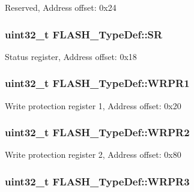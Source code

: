 Reserved, Address offset\-: 0x24 \hypertarget{struct_f_l_a_s_h___type_def_a52c4943c64904227a559bf6f14ce4de6}{
\subsubsection[{S\-R}]{ uint32\-\_\-t F\-L\-A\-S\-H\-\_\-\-Type\-Def\-::\-S\-R}}\label{struct_f_l_a_s_h___type_def_a52c4943c64904227a559bf6f14ce4de6}
Status register, Address offset\-: 0x18 \hypertarget{struct_f_l_a_s_h___type_def_a8f94f0938663804b2d9de2002a4e7e67}{
\subsubsection[{W\-R\-P\-R1}]{ uint32\-\_\-t F\-L\-A\-S\-H\-\_\-\-Type\-Def\-::\-W\-R\-P\-R1}}\label{struct_f_l_a_s_h___type_def_a8f94f0938663804b2d9de2002a4e7e67}
Write protection register 1, Address offset\-: 0x20 \hypertarget{struct_f_l_a_s_h___type_def_a79b0e64b11e40d304573f0b501355aab}{
\subsubsection[{W\-R\-P\-R2}]{ uint32\-\_\-t F\-L\-A\-S\-H\-\_\-\-Type\-Def\-::\-W\-R\-P\-R2}}\label{struct_f_l_a_s_h___type_def_a79b0e64b11e40d304573f0b501355aab}
Write protection register 2, Address offset\-: 0x80 \hypertarget{struct_f_l_a_s_h___type_def_ac04bb0c39c1419d049cb23e2c18240b3}{
\subsubsection[{W\-R\-P\-R3}]{ uint32\-\_\-t F\-L\-A\-S\-H\-\_\-\-Type\-Def\-::\-W\-R\-P\-R3}}\label{struct_f_l_a_s_h___type_def_ac04bb0c39c1419d049cb23e2c18240b3}
